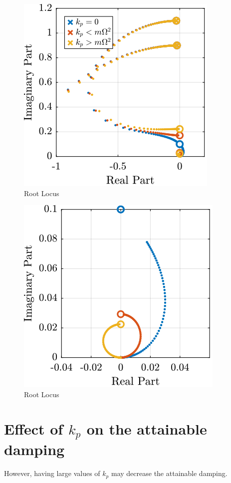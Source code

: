 \documentclass[a4paper, 10pt, DIV=12, parskip=full]{scrreprt}
\begin{document}
\begin{figure}[htbp]
\centering
\includegraphics[scale=1]{figs/root_locus_iff_kp.png}
\caption{\label{fig:root_locus_iff_kp}Root Locus}
\end{figure}

\begin{figure}[htbp]
\centering
\includegraphics[scale=1]{figs/root_locus_iff_kp_zoom.png}
\caption{\label{fig:root_locus_iff_kp_zoom}Root Locus}
\end{figure}

\section{Effect of \(k_p\) on the attainable damping}
\label{sec:orgcb7905c}
However, having large values of \(k_p\) may decrease the attainable damping.
\end{document}
